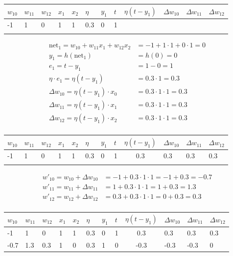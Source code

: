 \documentclass[11pt]{article}
\begin{document}
\begin{tabularx}{\linewidth}{XXXXXXXXcXXX}
    \hline
    $w_{10}$ & $w_{11}$ & $w_{12}$ & $x_1$ & $x_2$ & $\eta$ & $y_1$ & $t$ & $\eta (t-y_1)$ & $\Delta w_{10}$ & $\Delta w_{11}$ & $\Delta w_{12}$\\
    \hline
    -1 & 1 & 0 & 1 & 1 & 0.3 & 0 & 1 & & & &\\
    \hline
    & & & & & & & & & & & \\
    \hline
\end{tabularx}

\begin{align*}
    \text{net}_1 = w_{10} + w_{11}x_1 + w_{12}x_2 &= -1 + 1\cdot 1 + 0\cdot 1 = 0\\
    y_1 = h(\text{net}_1) &= h(0) = 0\\
    e_1 = t - y_1 &= 1 - 0 = 1\\
    \eta \cdot e_1 = \eta (t - y_1) &= 0.3\cdot 1 = 0.3\\
    \Delta w_{10} = \eta (t - y_1) \cdot x_0 &= 0.3\cdot 1\cdot 1 = 0.3\\
    \Delta w_{11} = \eta (t - y_1) \cdot x_1 &= 0.3\cdot 1\cdot 1 = 0.3\\
    \Delta w_{12} = \eta (t - y_1) \cdot x_2 &= 0.3\cdot 1\cdot 1 = 0.3\\
\end{align*}


\begin{tabularx}{\linewidth}{XXXXXXXXcXXX}
    \hline
    $w_{10}$ & $w_{11}$ & $w_{12}$ & $x_1$ & $x_2$ & $\eta$ & $y_1$ & $t$ & $\eta (t-y_1)$ & $\Delta w_{10}$ & $\Delta w_{11}$ & $\Delta w_{12}$\\
    \hline
    -1 & 1 & 0 & 1 & 1 & 0.3 & 0 & 1 & 0.3 & 0.3 & 0.3 & 0.3\\
    \hline
    & & & & & & & & & & & \\
    \hline
\end{tabularx}

\begin{align*}
    w'_{10} = w_{10} + \Delta w_{10} &= -1 + 0.3\cdot 1\cdot 1 = -1 + 0.3 = -0.7\\
    w'_{11} = w_{11} + \Delta w_{11} &= 1 + 0.3\cdot 1\cdot 1 = 1 + 0.3 = 1.3 \\
    w'_{12} = w_{12} + \Delta w_{12} &= 0.3 + 0.3\cdot 1\cdot 1 = 0 + 0.3 = 0.3 \\
\end{align*}

\begin{tabularx}{\linewidth}{XXXXXXXXcXXX}
    \hline
    $w_{10}$ & $w_{11}$ & $w_{12}$ & $x_1$ & $x_2$ & $\eta$ & $y_1$ & $t$ & $\eta (t-y_1)$ & $\Delta w_{10}$ & $\Delta w_{11}$ & $\Delta w_{12}$\\
    \hline
    -1 & 1 & 0 & 1 & 1 & 0.3 & 0 & 1 & 0.3 & 0.3 & 0.3 & 0.3\\
    \hline
    -0.7 & 1.3 & 0.3 & 1 & 0 & 0.3 & 1 & 0 & -0.3 & -0.3 & -0.3 & 0\\
    \hline
\end{tabularx}
\end{document}
